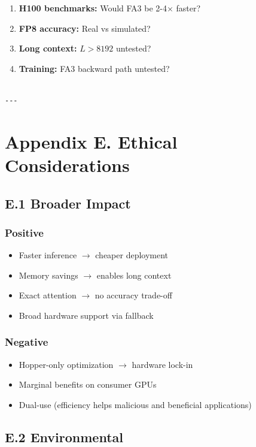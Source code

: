 \begin{enumerate}
\item \textbf{H100 benchmarks:} Would FA3 be 2-4$\times$ faster?
\item \textbf{FP8 accuracy:} Real vs simulated?
\item \textbf{Long context:} $L > 8192$ untested?
\item \textbf{Training:} FA3 backward path untested?
\end{enumerate}
\begin{lstlisting}

---
\end{lstlisting}

\section{Appendix E. Ethical Considerations}

\subsection{E.1 Broader Impact}

\subsubsection{Positive}
\begin{itemize}
\item Faster inference $\to$ cheaper deployment
\item Memory savings $\to$ enables long context
\item Exact attention $\to$ no accuracy trade-off
\item Broad hardware support via fallback

\end{itemize}
\subsubsection{Negative}
\begin{itemize}
\item Hopper-only optimization $\to$ hardware lock-in
\item Marginal benefits on consumer GPUs
\item Dual-use (efficiency helps malicious and beneficial applications)

\end{itemize}
\subsection{E.2 Environmental}


